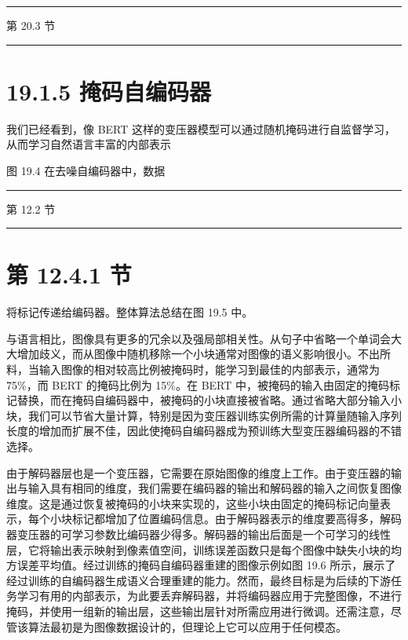 \documentclass[10pt]{article}
\newcommand{\HRule}{\begin{center}\rule{0.9\linewidth}{0.2mm}\end{center}}
\begin{document}
\HRule

第 20.3 节

\HRule

\section*{19.1.5 掩码自编码器}

我们已经看到，像 BERT 这样的变压器模型可以通过随机掩码进行自监督学习，从而学习自然语言丰富的内部表示

图 19.4 在去噪自编码器中，数据

\HRule

第 12.2 节

\HRule

\section*{第 12.4.1 节}

将标记传递给编码器。整体算法总结在图 19.5 中。

与语言相比，图像具有更多的冗余以及强局部相关性。从句子中省略一个单词会大大增加歧义，而从图像中随机移除一个小块通常对图像的语义影响很小。不出所料，当输入图像的相对较高比例被掩码时，能学习到最佳的内部表示，通常为 75\%，而 BERT 的掩码比例为 15\%。在 BERT 中，被掩码的输入由固定的掩码标记替换，而在掩码自编码器中，被掩码的小块直接被省略。通过省略大部分输入小块，我们可以节省大量计算，特别是因为变压器训练实例所需的计算量随输入序列长度的增加而扩展不佳，因此使掩码自编码器成为预训练大型变压器编码器的不错选择。

由于解码器层也是一个变压器，它需要在原始图像的维度上工作。由于变压器的输出与输入具有相同的维度，我们需要在编码器的输出和解码器的输入之间恢复图像维度。这是通过恢复被掩码的小块来实现的，这些小块由固定的掩码标记向量表示，每个小块标记都增加了位置编码信息。由于解码器表示的维度要高得多，解码器变压器的可学习参数比编码器少得多。解码器的输出后面是一个可学习的线性层，它将输出表示映射到像素值空间，训练误差函数只是每个图像中缺失小块的均方误差平均值。经过训练的掩码自编码器重建的图像示例如图 19.6 所示，展示了经过训练的自编码器生成语义合理重建的能力。然而，最终目标是为后续的下游任务学习有用的内部表示，为此要丢弃解码器，并将编码器应用于完整图像，不进行掩码，并使用一组新的输出层，这些输出层针对所需应用进行微调。还需注意，尽管该算法最初是为图像数据设计的，但理论上它可以应用于任何模态。
\end{document}
